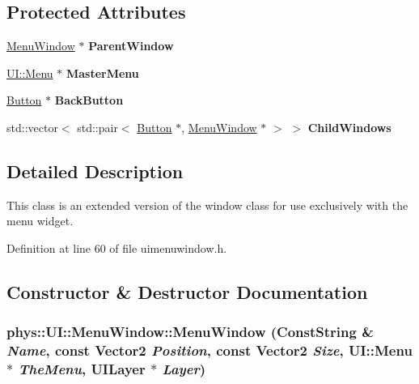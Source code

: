 \subsection*{Protected Attributes}
\begin{DoxyCompactItemize}
\item 
\hypertarget{classphys_1_1UI_1_1MenuWindow_a94ec8861afbc6f39ac4b443a912bc0c1}{
\hyperlink{classphys_1_1UI_1_1MenuWindow}{MenuWindow} $\ast$ {\bfseries ParentWindow}}
\label{d4/d07/classphys_1_1UI_1_1MenuWindow_a94ec8861afbc6f39ac4b443a912bc0c1}

\item 
\hypertarget{classphys_1_1UI_1_1MenuWindow_adeed2fd68308846df8885febee141111}{
\hyperlink{classphys_1_1UI_1_1Menu}{UI::Menu} $\ast$ {\bfseries MasterMenu}}
\label{d4/d07/classphys_1_1UI_1_1MenuWindow_adeed2fd68308846df8885febee141111}

\item 
\hypertarget{classphys_1_1UI_1_1MenuWindow_a02826ad4a8d0b8934a7dbe86e4ea3edf}{
\hyperlink{classphys_1_1UI_1_1Button}{Button} $\ast$ {\bfseries BackButton}}
\label{d4/d07/classphys_1_1UI_1_1MenuWindow_a02826ad4a8d0b8934a7dbe86e4ea3edf}

\item 
\hypertarget{classphys_1_1UI_1_1MenuWindow_ae55c88520920e44c0bb125e812d62272}{
std::vector$<$ std::pair$<$ \hyperlink{classphys_1_1UI_1_1Button}{Button} $\ast$, \hyperlink{classphys_1_1UI_1_1MenuWindow}{MenuWindow} $\ast$ $>$ $>$ {\bfseries ChildWindows}}
\label{d4/d07/classphys_1_1UI_1_1MenuWindow_ae55c88520920e44c0bb125e812d62272}

\end{DoxyCompactItemize}


\subsection{Detailed Description}
This class is an extended version of the window class for use exclusively with the menu widget. 

Definition at line 60 of file uimenuwindow.h.



\subsection{Constructor \& Destructor Documentation}
\hypertarget{classphys_1_1UI_1_1MenuWindow_a8d62e0cdbb3e8073c62b67c3e0b4dfda}{
\subsubsection[{MenuWindow}]{\setlength{\rightskip}{0pt plus 5cm}phys::UI::MenuWindow::MenuWindow ({\bf ConstString} \& {\em Name}, \/  const {\bf Vector2} {\em Position}, \/  const {\bf Vector2} {\em Size}, \/  {\bf UI::Menu} $\ast$ {\em TheMenu}, \/  {\bf UILayer} $\ast$ {\em Layer})}}
\label{d4/d07/classphys_1_1UI_1_1MenuWindow_a8d62e0cdbb3e8073c62b67c3e0b4dfda}


